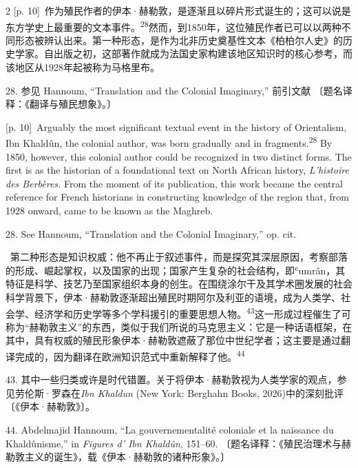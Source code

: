 \documentclass[10pt,a4paper]{article}
\begin{document}
\begin{paracol}{2}
{\scriptsize\color{gray} [p. 10]}\ 作为殖民作者的伊本·赫勒敦，是逐渐且以碎片形式诞生的；这可以说是东方学史上最重要的文本事\mbox{件。\textsuperscript{28}}然而，到1850年，这位殖民作者已可以以两种不同形态被辨认出来。第一种形态，是作为北非历史奠基性文本《柏柏尔人史》的历史学家。自出版之初，这部著作就成为法国史家构建该地区知识时的核心参考，而该地区从1928年起被称为马格里布。\par{\small 28. 参见 Hannoum, “Translation and the Colonial Imaginary,” 前引文献 〔题名译释：《翻译与殖民想象》。〕\par}
\switchcolumn
{\scriptsize\color{gray} [p. 10]}\ Arguably the most significant textual event in the history of Orientalism, Ibn Khaldûn, the colonial author, was born gradually and in fragments.\nobreak\textsuperscript{28} By 1850, however, this colonial author could be recognized in two distinct forms. The first is as the historian of a foundational text on North African history, \textit{L’histoire des Berbères.} From the moment of its publication, this work became the central reference for French historians in constructing knowledge of the region that, from 1928 onward, came to be known as the Maghreb.\par{\small 28. See Hannoum, “Translation and the Colonial Imaginary,” op. cit.\par}
\switchcolumn*
{\scriptsize\color{gray} [p. 10]}\ 第二种形态是知识权威：他不再止于叙述事件，而是探究其深层原因，考察部落的形成、崛起掌权，以及国家的出现；国家产生复杂的社会结构，即ʿumrân，其特征是科学、技艺乃至国家组织本身的创生。在围绕涂尔干及其学术圈发展的社会科学背景下，伊本·赫勒敦逐渐超出殖民时期阿尔及利亚的语境，成为人类学、社会学、经济学和历史学等多个学科援引的重要思想人\mbox{物。\textsuperscript{43}}这一形成过程催生了可称为“赫勒敦主义”的东西，类似于我们所说的马克思主义：它是一种话语框架，在其中，具有权威的殖民形象伊本·赫勒敦遮蔽了那位中世纪学者；这主要是通过翻译完成的，因为翻译在欧洲知识范式中重新解释了\mbox{他。\textsuperscript{44}}\par{\small 43. 其中一些归类或许是时代错置。关于将伊本·赫勒敦视为人类学家的观点，参见劳伦斯·罗森在\textit{Ibn Khaldun} (New York: Berghahn Books, 2026)中的深刻批评〔《伊本·赫勒敦》〕。\par}{\small 44. Abdelmajid Hannoum, “La gouvernementalité coloniale et la naissance du Khaldûnisme,” in \textit{Figures d’ Ibn Khaldûn}, 151–60. 〔题名译释：《殖民治理术与赫勒敦主义的诞生》，载《伊本·赫勒敦的诸种形象》。〕\par}
\switchcolumn

\end{paracol}
\end{document}
